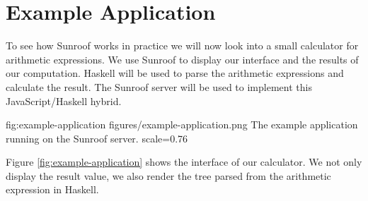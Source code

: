  
\section{Example Application}
\label{sec:extended-example}

To see how Sunroof works in practice we will now look into a small calculator
for arithmetic expressions. We use Sunroof to display our interface
and the results of our computation. Haskell will be used to parse the 
arithmetic expressions and calculate the result. The Sunroof server 
will be used to implement this JavaScript/Haskell hybrid.

\FigureS%
{fig:example-application}%
{figures/example-application.png}%
{The example application running on the Sunroof server.}%
{scale=0.76}

Figure \ref{fig:example-application} shows the interface of our 
calculator. We not only display the result value, we also render 
the tree parsed from the arithmetic expression in Haskell.





